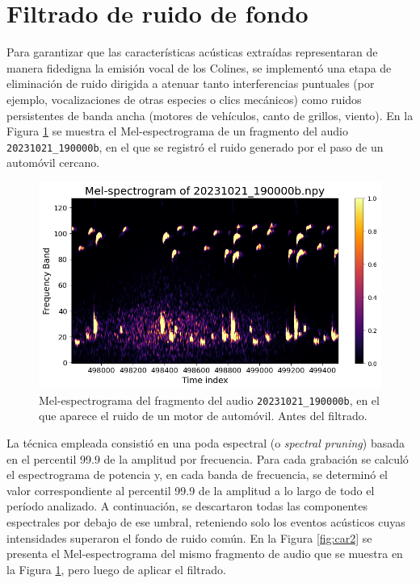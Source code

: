 \section{Filtrado de ruido de fondo}
\label{sec:filtrado}


Para garantizar que las características acústicas extraídas 
representaran de manera fidedigna la emisión vocal de los 
Colines, se implementó una etapa de eliminación de 
ruido dirigida a atenuar tanto interferencias puntuales (por 
ejemplo, vocalizaciones de otras especies o clics mecánicos) 
como ruidos persistentes de banda ancha (motores de vehículos, 
canto de grillos, viento). En la 
Figura \ref{fig:car} se muestra el Mel-espectrograma de un 
fragmento del audio \texttt{20231021\_190000b}, en el que se registró el ruido generado por el paso 
de un automóvil cercano.


\begin{figure}[ht]
    \centering
    \includegraphics[width=\columnwidth]{Graphics/car_noise_before.png}
    \caption{Mel-espectrograma del fragmento del audio \texttt{20231021\_190000b}, en el que aparece el ruido de un motor de automóvil. Antes del filtrado.}
    \label{fig:car}
\end{figure}

La técnica empleada consistió en una poda espectral (o \emph{spectral pruning}) basada en 
el percentil 99.9 de la amplitud por frecuencia. 
Para cada grabación se calculó el 
espectrograma de potencia y, en cada banda de frecuencia, se 
determinó el valor correspondiente al percentil 99.9 de la 
amplitud a lo largo de todo el período analizado. 
A continuación, se descartaron todas las componentes espectrales 
por 
debajo de ese umbral, reteniendo solo los eventos acústicos 
cuyas intensidades superaron el fondo de ruido común.
En la Figura \ref{fig:car2} se presenta el Mel-espectrograma
del mismo fragmento de audio que se muestra en la Figura \ref{fig:car},
pero luego de aplicar el filtrado.

